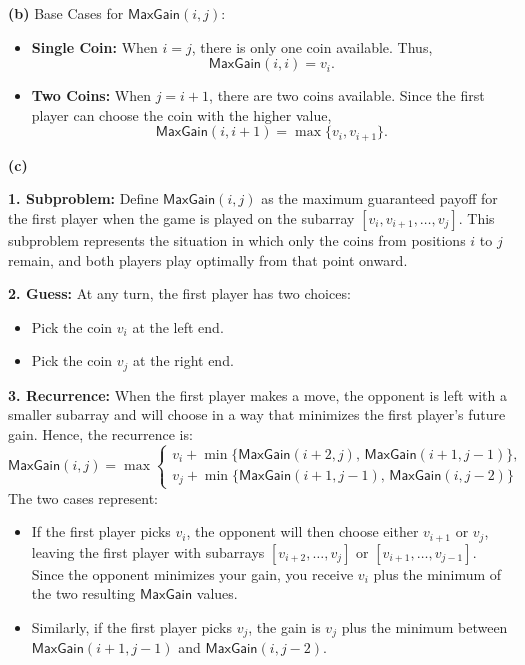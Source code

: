 \documentclass[11pt]{article}
\begin{document}
        \textbf{(b)} Base Cases for \(\mathsf{MaxGain}(i,j)\):
        \begin{itemize}
            \item \textbf{Single Coin:} When \(i = j\), there is only one coin available. Thus,
            \[
            \mathsf{MaxGain}(i,i) = v_i.
            \]
            \item \textbf{Two Coins:} When \(j = i+1\), there are two coins available. Since the first player can choose the coin with the higher value,
            \[
            \mathsf{MaxGain}(i,i+1) = \max\{v_i, v_{i+1}\}.
            \]
        \end{itemize}
        
        \bigskip
        
        \textbf{(c)}

        \textbf{1. Subproblem:}  
        Define \(\mathsf{MaxGain}(i,j)\) as the maximum guaranteed payoff for the first player when the game is played on the subarray \([v_i, v_{i+1}, \dots, v_j]\). This subproblem represents the situation in which only the coins from positions \(i\) to \(j\) remain, and both players play optimally from that point onward.
        
        \bigskip
        
        \textbf{2. Guess:}  
        At any turn, the first player has two choices:  
        \begin{itemize}
            \item Pick the coin \(v_i\) at the left end.
            \item Pick the coin \(v_j\) at the right end.
        \end{itemize}
        
        \bigskip
        
        \textbf{3. Recurrence:}  
        When the first player makes a move, the opponent is left with a smaller subarray and will choose in a way that minimizes the first player's future gain. Hence, the recurrence is:
        \[
        \mathsf{MaxGain}(i,j) = \max\left\{
        \begin{array}{l}
        v_i + \min\{\mathsf{MaxGain}(i+2,j),\, \mathsf{MaxGain}(i+1,j-1)\},\\[1mm]
        v_j + \min\{\mathsf{MaxGain}(i+1,j-1),\, \mathsf{MaxGain}(i,j-2)\}
        \end{array}
        \right.
        \]
        The two cases represent:
        \begin{itemize}
            \item If the first player picks \(v_i\), the opponent will then choose either \(v_{i+1}\) or \(v_j\), leaving the first player with subarrays \([v_{i+2},\dots,v_j]\) or \([v_{i+1},\dots,v_{j-1}]\). Since the opponent minimizes your gain, you receive \(v_i\) plus the minimum of the two resulting \(\mathsf{MaxGain}\) values.
            \item Similarly, if the first player picks \(v_j\), the gain is \(v_j\) plus the minimum between \(\mathsf{MaxGain}(i+1,j-1)\) and \(\mathsf{MaxGain}(i,j-2)\).
        \end{itemize}
        
\end{document}
